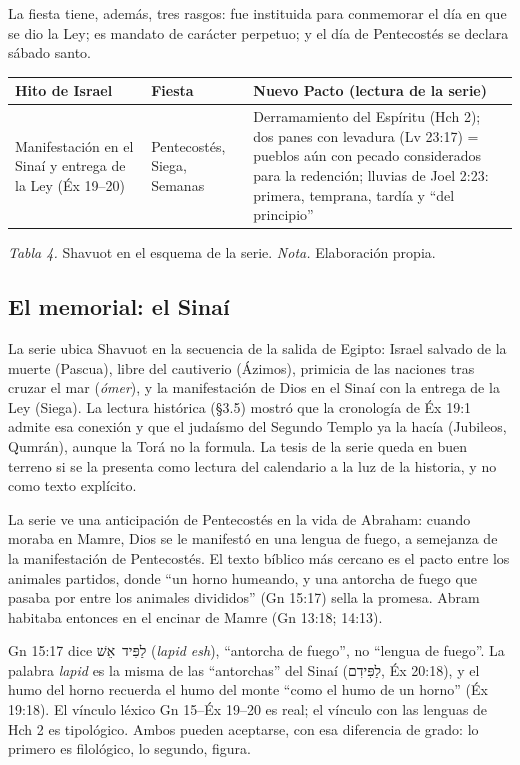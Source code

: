 \documentclass[11pt,letterpaper]{article}
\newcommand{\heb}[1]{\mbox{\foreignlanguage{hebrew}{#1}}}
\begin{document}
La fiesta tiene, además, tres rasgos: fue instituida para conmemorar el día en que se dio la Ley; es mandato de carácter perpetuo; y el día de Pentecostés se declara sábado santo.

\begin{center}\small\renewcommand{\arraystretch}{1.25}
\begin{tabular}{@{}L{3.6cm}L{3.2cm}L{8.6cm}@{}}
\toprule
\textbf{Hito de Israel} & \textbf{Fiesta} & \textbf{Nuevo Pacto (lectura de la serie)} \\ \midrule
Manifestación en el Sinaí y entrega de la Ley (Éx 19--20) & Pentecostés, Siega, Semanas & Derramamiento del Espíritu (Hch 2); dos panes con levadura (Lv 23:17) = pueblos aún con pecado considerados para la redención; lluvias de Joel 2:23: primera, temprana, tardía y ``del principio'' \\
\bottomrule
\end{tabular}\par
{\footnotesize\color{sepia}\textit{Tabla 4.} Shavuot en el esquema de la serie. \textit{Nota.} Elaboración propia.}
\end{center}

\subsection{El memorial: el Sinaí}

La serie ubica Shavuot en la secuencia de la salida de Egipto: Israel salvado de la muerte (Pascua), libre del cautiverio (Ázimos), primicia de las naciones tras cruzar el mar (\emph{ómer}), y la manifestación de Dios en el Sinaí con la entrega de la Ley (Siega). La lectura histórica (§3.5) mostró que la cronología de Éx 19:1 admite esa conexión y que el judaísmo del Segundo Templo ya la hacía (Jubileos, Qumrán), aunque la Torá no la formula. La tesis de la serie queda en buen terreno si se la presenta como lectura del calendario a la luz de la historia, y no como texto explícito.

La serie ve una anticipación de Pentecostés en la vida de Abraham: cuando moraba en Mamre, Dios se le manifestó en una lengua de fuego, a semejanza de la manifestación de Pentecostés. El texto bíblico más cercano es el pacto entre los animales partidos, donde ``un horno humeando, y una antorcha de fuego que pasaba por entre los animales divididos'' (Gn 15:17) sella la promesa. Abram habitaba entonces en el encinar de Mamre (Gn 13:18; 14:13).

\begin{nota}[Precisión]
Gn 15:17 dice \heb{לַפִּיד אֵשׁ} (\emph{lapid esh}), ``antorcha de fuego'', no ``lengua de fuego''. La palabra \emph{lapid} es la misma de las ``antorchas'' del Sinaí (\heb{לַפִּידִם}, Éx 20:18), y el humo del horno recuerda el humo del monte ``como el humo de un horno'' (Éx 19:18). El vínculo léxico Gn 15--Éx 19--20 es real; el vínculo con las lenguas de Hch 2 es tipológico. Ambos pueden aceptarse, con esa diferencia de grado: lo primero es filológico, lo segundo, figura.
\end{nota}
\end{document}
